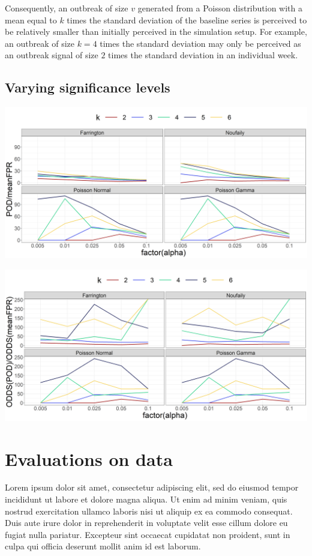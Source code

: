 \documentclass[preprint, 3p, authoryear]{elsarticle} %
\begin{document}
Consequently, an outbreak of size \(v\) generated from a Poisson distribution with a mean equal to \(k\) times the standard deviation of the baseline series is perceived to be relatively smaller than initially perceived in the simulation setup. For example, an outbreak of size \(k=4\) times the standard deviation may only be perceived as an outbreak signal of size \(2\) times the standard deviation in an individual week.

\hypertarget{varying-significance-levels}{%
\subsection{Varying significance levels}\label{varying-significance-levels}}

\includegraphics[width=1\linewidth]{../../figures/POD_FPR}

\includegraphics[width=1\linewidth]{../../figures/ODDS_POD_FPR}

\hypertarget{evaluations-on-data}{%
\section{Evaluations on data}\label{evaluations-on-data}}

Lorem ipsum dolor sit amet, consectetur adipiscing elit, sed do eiusmod tempor incididunt ut labore et dolore magna aliqua. Ut enim ad minim veniam, quis nostrud exercitation ullamco laboris nisi ut aliquip ex ea commodo consequat. Duis aute irure dolor in reprehenderit in voluptate velit esse cillum dolore eu fugiat nulla pariatur. Excepteur sint occaecat cupidatat non proident, sunt in culpa qui officia deserunt mollit anim id est laborum.
\end{document}
